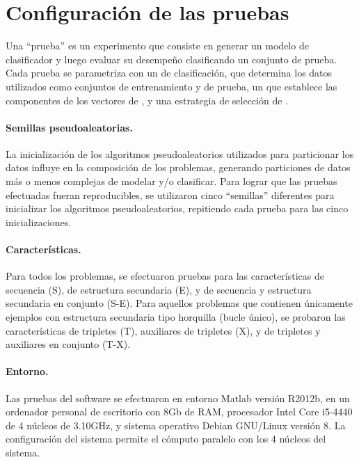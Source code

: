 %
%
%
\section{Configuración de las pruebas}
%
Una ``prueba'' es un experimento que consiste en generar un modelo de
clasificador y luego evaluar su desempeño clasificando un conjunto de
prueba.
Cada prueba se parametriza con un  de clasificación, que
determina los datos utilizados como conjuntos de entrenamiento y de
prueba, un  que establece las componentes de
los vectores de , y una estrategia de selección de .

\paragraph{Semillas pseudoaleatorias.}
La inicialización de los algoritmos pseudoaleatorios utilizados para
particionar los datos influye en la composición de los problemas,
generando particiones de datos más o menos complejas de modelar y/o
clasificar.
Para lograr que las pruebas efectuadas fueran reproducibles, se
utilizaron cinco ``semillas'' diferentes para inicializar los
algoritmos pseudoaleatorios, repitiendo cada prueba para las cinco
inicializaciones.

\paragraph{Características.}
Para todos los problemas, se efectuaron pruebas para las
características de secuencia (S), de estructura secundaria (E), y de
secuencia y estructura secundaria en conjunto (S-E).
Para aquellos problemas que contienen únicamente ejemplos con
estructura secundaria tipo horquilla (bucle único), se probaron las
características de tripletes (T), auxiliares de tripletes (X), y de
tripletes y auxiliares en conjunto (T-X).

\paragraph{Entorno.}
Las pruebas del software se efectuaron en entorno Matlab versión
R2012b, en un ordenador personal de escritorio con 8\si{\giga b} de
RAM, procesador Intel Core i5-4440 de 4 núcleos de 3.10\si{\giga Hz},
y sistema operativo Debian GNU/Linux versión 8.
La configuración del sistema permite el cómputo paralelo con los 4
núcleos del sistema.


